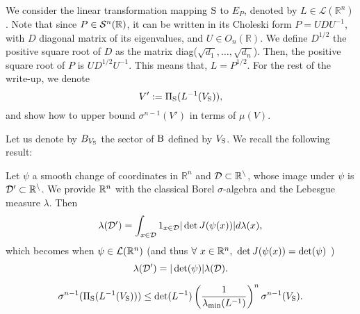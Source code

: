 We consider the linear transformation mapping $\text{S}$ to $E_P$, denoted by $L \in \mathcal{L}(\mathbb{R}^n)$. Note that since $P \in \mathcal{S}^n(\mathbb{R})$, it can be written in its Choleski form $P = U D U^{-1}$, with $D$ diagonal matrix of its eigenvalues, and $U \in O_n(\mathbb{R})$. We define $D^{1/2}$ the positive square root of $D$ as the matrix diag($\sqrt{d_1},\dots, \sqrt{d_n}$). Then, the positive square root of $P$ is $U D^{1/2} U^{-1}$. This means that, $L = P^{1/2}$. For the rest of the write-up, we denote $$V':=\Pi_{\text{S}}(L^{-1}(V_{\text{S}})),$$ and show how to upper bound $\sigma^{n-1}(V')$ in terms of $\mu(V)$.


Let us denote by $B_{V_{\text{S}}}$ the sector of $\text{B}$ defined by $V_{\text{S}}$. We recall the following result:

\begin{lemma} \label{lemma:mappingMeasures}
Let $\psi$ a smooth change of coordinates in $\mathbb{R}^n$ and $\cal{D} \subset \mathbb{R}^n$, whose image under $\psi$ is $\cal{D}' \subset \mathbb{R}^n$. We provide $\mathbb{R}^n$ with the classical Borel $\sigma$-algebra and the Lebesgue measure $\lambda$. Then
\begin{equation}
\lambda(\mathcal{D}') = \int_{x \in \mathcal{D}} 1_{x \in \mathcal{D}} |\det J(\psi(x))| d\lambda(x),
\end{equation}
which becomes when $\psi \in \mathcal{L}(\mathbb{R}^n)$ (and thus $\forall\ x \in \mathbb{R}^n, \ \det J(\psi(x)) = \det(\psi)$ )
\begin{equation}
\lambda(\mathcal{D}') = |\det(\psi)| \lambda(\mathcal{D}).
\end{equation}
\end{lemma}


\begin{theorem} \label{lemma:lip}
\begin{equation}
\sigma^{n-1}(\Pi_{\text{S}}(L^{-1}(V_{\text{S}}))) \leq \det(L^{-1}) \left(\frac{1}{\lambda_{\min}(L^{-1})}\right)^n \sigma^{n-1}(V_{\text{S}}).
\end{equation}   
\end{theorem}

